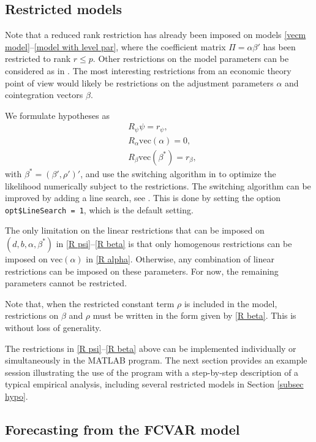 \documentclass[article]{jss}
\begin{document}
\subsection{Restricted models}
\label{restricted models}

Note that a reduced rank restriction has already been imposed on models \eqref{vecm model}--\eqref{model with level par}, where the coefficient matrix $\Pi  = \alpha \beta '$ has been restricted to rank $r \leq p$. Other restrictions on the model parameters can be considered as in \cite{Johansen1995}. The most interesting restrictions from an economic theory point of view would likely be restrictions on the adjustment parameters $\alpha$ and cointegration vectors $\beta$.

We formulate hypotheses as
\begin{align}
  &R_{\psi} \psi = r_{\psi}, \label{R psi} \\
  &R_\alpha \mathrm{vec}(\alpha) = 0, \label{R alpha} \\
  &R_\beta \mathrm{vec}(\beta^{\ast}) = r_\beta, \label{R beta}
\end{align}
with $\beta^{\ast} = (\beta', \rho')'$, and use the switching algorithm in \cite[p.\ 455]{Boswijk2004} to optimize the likelihood numerically subject to the restrictions. The switching algorithm can be improved by adding a line search, see \cite{Doornik2016}. This is done by setting the option \verb|opt$LineSearch = 1|, which is the default setting.

The only limitation on the linear restrictions that can be imposed on $(d,b,\alpha,\beta^{\ast})$ in \eqref{R psi}--\eqref{R beta} is that only homogenous restrictions can be imposed on $\mathrm{vec}(\alpha)$ in \eqref{R alpha}. Otherwise, any combination of linear restrictions can be imposed on these parameters. For now, the remaining parameters cannot be restricted.

Note that, when the restricted constant term $\rho$ is included in the model, restrictions on $\beta$ and $\rho$ must be written in the form given by \eqref{R beta}. This is without loss of generality.

The restrictions in \eqref{R psi}--\eqref{R beta} above can be implemented individually or simultaneously in the MATLAB program. The next section provides an example session illustrating the use of the program with a step-by-step description of a typical empirical analysis, including several restricted models in Section \ref{subsec hypo}.

\subsection{Forecasting from the FCVAR model}
\end{document}
